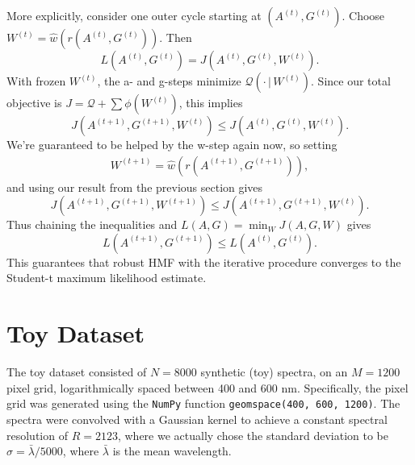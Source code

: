 \documentclass[onecolumn,floatfix,linenumbers,trackchanges]{aastex631}
\begin{document}
More explicitly, consider one outer cycle starting at $(A^{(t)}, G^{(t)})$.
Choose $W^{(t)} = \hat{w}(r(A^{(t)},G^{(t)}))$.
Then
\begin{equation}
    L(A^{(t)}, G^{(t)}) = J(A^{(t)}, G^{(t)}, W^{(t)}).
\end{equation}
With frozen $W^{(t)}$, the a- and g-steps minimize $\mathcal{Q}(\cdot \,| \,W^{(t)})$.
Since our total objective is $J = \mathcal{Q} + \sum \phi(W^{(t)})$, this implies
\begin{equation}
    J(A^{(t+1)}, G^{(t+1)}, W^{(t)}) \le J(A^{(t)}, G^{(t)}, W^{(t)}).
\end{equation}
We're guaranteed to be helped by the w-step again now, so setting
\begin{align}
    W^{(t+1)} = \hat{w} \left( r(A^{(t+1)}, G^{(t+1)}) \right),
\end{align}
and using our result from the previous section gives
\begin{equation}
    J(A^{(t+1)}, G^{(t+1)}, W^{(t+1)}) \le J(A^{(t+1)}, G^{(t+1)}, W^{(t)}).
\end{equation}
Thus chaining the inequalities and $L(A,G) = \min_W J(A, G, W)$ gives
\begin{equation}
    L(A^{(t+1)}, G^{(t+1)}) \le L(A^{(t)}, G^{(t)}).
\end{equation}
This guarantees that robust HMF with the iterative procedure converges to the Student-t maximum likelihood estimate.

\section{Toy Dataset} \label{sec:toy_model_details}

The toy dataset consisted of $N=8000$ synthetic (toy) spectra, on an $M=1200$ pixel grid, logarithmically spaced between 400 and 600 nm.
Specifically, the pixel grid was generated using the \texttt{NumPy} function \texttt{geomspace(400, 600, 1200)}.
The spectra were convolved with a Gaussian kernel to achieve a constant spectral resolution of $R = 2123$, where we actually chose the standard deviation to be $\sigma = \bar{\lambda} / 5000$, where $\bar{\lambda}$ is the mean wavelength.
\end{document}
